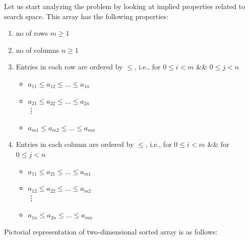 \noindent \qquad Let us start analyzing the problem by looking at implied properties related to search space. This array has the following properties:
\begin{enumerate}
    \item no of rows $m \geq 1$
    \item no of columns  $n \geq 1$
    \item Entries in each row are ordered by $\leq$, i.e., for $0 \leq i < m$ \&\& $0 \leq j < n$ 
    \vspace{1mm}\\
    \begin{itemize}
        \item $a_{11} \leq a_{12} \leq \ldots \leq a_{1n}$
        \item $a_{21} \leq a_{22} \leq \ldots \leq a_{2n}$
        \vspace{1mm}\\\vdots
        \item $a_{m1} \leq a_{m2} \leq \ldots \leq a_{mn}$
    \end{itemize}
    \item Entries in each column are ordered by $\leq$, i.e., for $0 \leq i < m$ \&\& for $0 \leq j < n$\vspace{1mm}\\
        \begin{itemize}
        \item $a_{11} \leq a_{21} \leq \ldots \leq a_{m1}$
        \item $a_{12} \leq a_{22} \leq \ldots \leq a_{m2}$
        \vspace{1mm}\\\vdots
        \item $a_{1n} \leq a_{2n} \leq \ldots \leq a_{mn}$
    \end{itemize}
\end{enumerate}


Pictorial representation of two-dimensional sorted array is as follows:
\begin{center}
\end{center}


